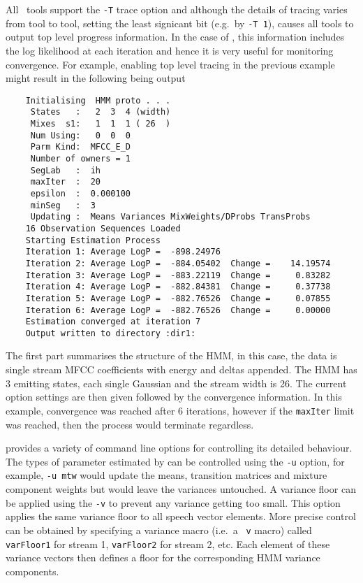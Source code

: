 All \HTK\ tools support the \texttt{-T}
 trace option and although the details of 
tracing varies from tool to tool, setting the least signicant bit (e.g.\ by \texttt{-T 1}), 
causes all tools to output top level progress information.  In the case
of , this information includes the log likelihood at each iteration and hence
it is very useful for monitoring convergence.  For example, enabling top level tracing
in the previous example might result in the following being output
\begin{verbatim}
    Initialising  HMM proto . . . 
     States   :   2  3  4 (width)
     Mixes  s1:   1  1  1 ( 26  )
     Num Using:   0  0  0
     Parm Kind:  MFCC_E_D
     Number of owners = 1
     SegLab   :  ih
     maxIter  :  20
     epsilon  :  0.000100
     minSeg   :  3
     Updating :  Means Variances MixWeights/DProbs TransProbs
    16 Observation Sequences Loaded
    Starting Estimation Process
    Iteration 1: Average LogP =  -898.24976
    Iteration 2: Average LogP =  -884.05402  Change =    14.19574
    Iteration 3: Average LogP =  -883.22119  Change =     0.83282
    Iteration 4: Average LogP =  -882.84381  Change =     0.37738
    Iteration 5: Average LogP =  -882.76526  Change =     0.07855
    Iteration 6: Average LogP =  -882.76526  Change =     0.00000
    Estimation converged at iteration 7
    Output written to directory :dir1:
\end{verbatim}
The first part summarises the structure of the HMM, in this case, the data is
single stream MFCC coefficients with energy and deltas appended.  The HMM has
3 emitting states, each single Gaussian and the stream width is 26.  The current
option settings are then given followed by the convergence information.  In this
example, convergence was reached after 6 iterations, however if the \texttt{maxIter}
limit was reached, then the process would terminate regardless.

 provides a variety of command line options for controlling 
its detailed behaviour.
The types of parameter 
estimated by  can be controlled
using the \texttt{-u} option, for example, \texttt{-u mtw} would update the means, 
transition matrices and
mixture component weights but would leave the variances untouched.  
A variance floor
can be applied using the \texttt{-v} to prevent any variance getting too small.   This
option applies the same variance floor to all speech vector elements.  More precise
control can be obtained by specifying a variance macro (i.e.\ a \texttt{~v} macro)
called \texttt{varFloor1} for 
stream 1, \texttt{varFloor2} for stream 2, etc.  Each
element of these variance vectors then defines a floor for the corresponding HMM variance
components.

